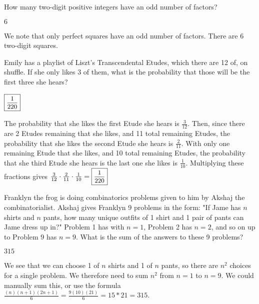 \documentclass[11pt]{article}
\begin{document}
\begin{problem}
How many two-digit positive integers have an odd number of factors?
\end{problem}
\begin{answer}
$\boxed{6}$
\end{answer}
\begin{solution}
We note that only perfect squares have an odd number of factors. There are 6 two-digit squares.
\end{solution}

\begin{problem}
Emily has a playlist of Liszt's Transcendental Etudes, which there are 12 of, on shuffle. If she only likes 3 of them, what is the probability that those will be the first three she hears?
\end{problem}
\begin{answer}
$\small\boxed{\frac{1}{220}\normalsize}$
\end{answer}
\begin{solution}
The probability that she likes the first Etude she hears is $\frac{3}{12}$. Then, since there are 2 Etudes remaining that she likes, and 11 total remaining Etudes, the probability that she likes the second Etude she hears is $\frac{2}{11}$. With only one remaining Etude that she likes, and 10 total remaining Etudes, the probability that she third Etude she hears is the last one she likes is $\frac{1}{10}$. Multiplying these fractions gives $\frac{3}{12}\cdot\frac{2}{11}\cdot\frac{1}{10}=\small\boxed{\frac{1}{220}\normalsize}$
\end{solution}

\begin{problem}
Franklyn the frog is doing combinatorics problems given to him by Akshaj the combinatorialist. Akshaj gives Franklyn 9 problems in the form: "If Jame has $n$ shirts and $n$ pants, how many unique outfits of 1 shirt and 1 pair of pants can Jame dress up in?" Problem 1 has with $n=1$, Problem 2 has $n=2$, and so on up to Problem 9 has $n=9$. What is the sum of the answers to these 9 problems?
\end{problem}
\begin{answer}
$\boxed{315}$
\end{answer}
\begin{solution}
We see that we can choose 1 of $n$ shirts and 1 of $n$ pants, so there are $n^2$ choices for a single problem. We therefore need to sum $n^2$ from $n=1$ to $n=9$. We could manually sum this, or use the formula $\frac{(n)(n+1)(2n+1)}{6} = \frac{9(10)(21)}{6} =15*21=\boxed{315}$.
\end{solution}
\end{document}
